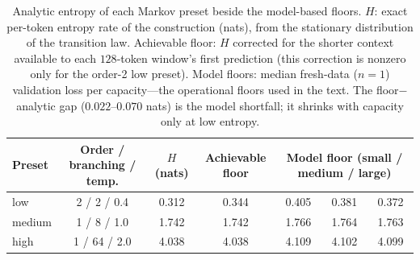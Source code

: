 \documentclass[11pt]{article}
\begin{document}
\begin{table}[htbp]
\centering
\caption{Analytic entropy of each Markov preset beside the model-based floors.
$H$: exact per-token entropy rate of the construction (nats), from the stationary
distribution of the transition law. Achievable floor: $H$ corrected for the shorter
context available to each $128$-token window's first prediction (this correction
is nonzero only for the order-2 low preset). Model floors: median fresh-data
($n{=}1$) validation loss per capacity---the operational floors used in the text.
The floor$-$analytic gap ($0.022$--$0.070$ nats) is the model shortfall; it shrinks
with capacity only at low entropy.}
\label{tab:entropy}
\scriptsize
\begin{tabular}{@{}lcccccc@{}}
\toprule
Preset & Order / branching / temp. & $H$ (nats) & Achievable floor & \multicolumn{3}{c}{Model floor (small / medium / large)} \\
\midrule
low    & 2 / 2 / 0.4   & 0.312 & 0.344 & 0.405 & 0.381 & 0.372 \\
medium & 1 / 8 / 1.0   & 1.742 & 1.742 & 1.766 & 1.764 & 1.763 \\
high   & 1 / 64 / 2.0  & 4.038 & 4.038 & 4.109 & 4.102 & 4.099 \\
\bottomrule
\end{tabular}
\end{table}
\end{document}
